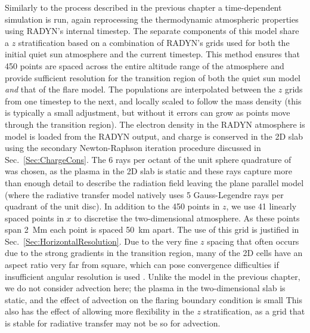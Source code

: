 Similarly to the process described in the previous chapter a time-dependent simulation is run, again reprocessing the thermodynamic atmospheric properties using RADYN's internal timestep.
The separate components of this model share a $z$ stratification based on a combination of RADYN's grids used for both the initial quiet sun atmosphere and the current timestep.
This method ensures that 450 points are spaced across the entire altitude range of the atmosphere and provide sufficient resolution for the transition region of both the quiet sun model \emph{and} that of the flare model.
The populations are interpolated between the $z$ grids from one timestep to the next, and locally scaled to follow the mass density (this is typically a small adjustment, but without it errors can grow as points move through the transition region).
The electron density in the RADYN atmosphere is model is loaded from the RADYN output, and charge is conserved in the 2D slab using the secondary Newton-Raphson iteration procedure discussed in Sec.~\ref{Sec:ChargeCons}.
The 6 rays per octant of the unit sphere quadrature of \citet{Stepan2020} was chosen, as the plasma in the 2D slab is static and these rays capture more than enough detail to describe the radiation field leaving the plane parallel model (where the radiative transfer model natively uses 5 Gauss-Legendre rays per quadrant of the unit disc).
In addition to the 450 points in $z$, we use 41 linearly spaced points in $x$ to discretise the two-dimensional atmosphere.
As these points span \SI{2}{\mega\metre} each point is spaced \SI{50}{\kilo\metre} apart.
The use of this grid is justified in Sec.~\ref{Sec:HorizontalResolution}.
Due to the very fine $z$ spacing that often occurs due to the strong gradients in the transition region, many of the 2D cells have an aspect ratio very far from square, which can pose convergence difficulties if insufficient angular resolution is used .
Unlike the model in the previous chapter, we do not consider advection here; the plasma in the two-dimensional slab is static, and the effect of advection on the flaring boundary condition is small
This also has the effect of allowing more flexibility in the $z$ stratification, as a grid that is stable for radiative transfer may not be so for advection.


